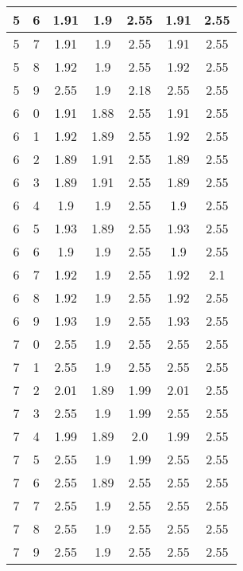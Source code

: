 \begin{longtable}{|c|c||c||c|c||c|c|}
	5 & 6 & 1.91 & 1.9 & 2.55 & 1.91 & 2.55 \\ \hline
	5 & 7 & 1.91 & 1.9 & 2.55 & 1.91 & 2.55 \\ \hline
	5 & 8 & 1.92 & 1.9 & 2.55 & 1.92 & 2.55 \\ \hline
	5 & 9 & 2.55 & 1.9 & 2.18 & 2.55 & 2.55 \\ \hline
	6 & 0 & 1.91 & 1.88 & 2.55 & 1.91 & 2.55 \\ \hline
	6 & 1 & 1.92 & 1.89 & 2.55 & 1.92 & 2.55 \\ \hline
	6 & 2 & 1.89 & 1.91 & 2.55 & 1.89 & 2.55 \\ \hline
	6 & 3 & 1.89 & 1.91 & 2.55 & 1.89 & 2.55 \\ \hline
	6 & 4 & 1.9 & 1.9 & 2.55 & 1.9 & 2.55 \\ \hline
	6 & 5 & 1.93 & 1.89 & 2.55 & 1.93 & 2.55 \\ \hline
	6 & 6 & 1.9 & 1.9 & 2.55 & 1.9 & 2.55 \\ \hline
	6 & 7 & 1.92 & 1.9 & 2.55 & 1.92 & 2.1 \\ \hline
	6 & 8 & 1.92 & 1.9 & 2.55 & 1.92 & 2.55 \\ \hline
	6 & 9 & 1.93 & 1.9 & 2.55 & 1.93 & 2.55 \\ \hline
	7 & 0 & 2.55 & 1.9 & 2.55 & 2.55 & 2.55 \\ \hline
	7 & 1 & 2.55 & 1.9 & 2.55 & 2.55 & 2.55 \\ \hline
	7 & 2 & 2.01 & 1.89 & 1.99 & 2.01 & 2.55 \\ \hline
	7 & 3 & 2.55 & 1.9 & 1.99 & 2.55 & 2.55 \\ \hline
	7 & 4 & 1.99 & 1.89 & 2.0 & 1.99 & 2.55 \\ \hline
	7 & 5 & 2.55 & 1.9 & 1.99 & 2.55 & 2.55 \\ \hline
	7 & 6 & 2.55 & 1.89 & 2.55 & 2.55 & 2.55 \\ \hline
	7 & 7 & 2.55 & 1.9 & 2.55 & 2.55 & 2.55 \\ \hline
	7 & 8 & 2.55 & 1.9 & 2.55 & 2.55 & 2.55 \\ \hline
	7 & 9 & 2.55 & 1.9 & 2.55 & 2.55 & 2.55 \\ \hline
\end{longtable}
\clearpage{}
